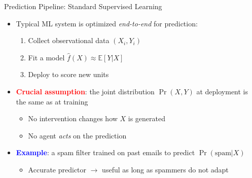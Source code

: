 \documentclass[
  10pt,
  ignorenonframetext,
]{beamer}
\providecommand{\tightlist}{%
  \setlength{\itemsep}{0pt}\setlength{\parskip}{0pt}}
\newcommand{\EE}{\mathbb{E}}
\begin{document}
\begin{frame}{Prediction Pipeline: Standard Supervised Learning}
\label{prediction-pipeline-standard-supervised-learning}
\begin{itemize}
\tightlist
\item
  Typical ML system is optimized \emph{end-to-end} for prediction:

  \begin{enumerate}
  \tightlist
  \item
    Collect observational data \((X_i, Y_i)\)
  \item
    Fit a model \(\hat{f}(X) \approx \EE[Y | X]\)
  \item
    Deploy to score new units
  \end{enumerate}
\item
  \textbf{\textcolor{red}{Crucial assumption}}: the joint distribution
  \(\Pr(X, Y)\) at deployment is the same as at training

  \begin{itemize}
  \tightlist
  \item
    No intervention changes how \(X\) is generated
  \item
    No agent \emph{acts} on the prediction
  \end{itemize}
\item
  \textbf{\textcolor{blue}{Example}}: a spam filter trained on past
  emails to predict \(\Pr(\text{spam} | X)\)

  \begin{itemize}
  \tightlist
  \item
    Accurate predictor \(\to\) useful as long as spammers do not adapt
  \end{itemize}
\end{itemize}
\end{frame}
\end{document}
